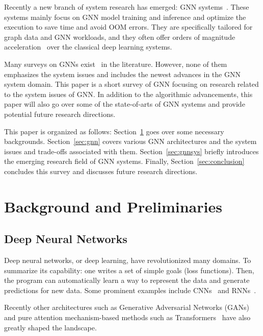 Recently a new branch of system research has emerged: GNN systems~\cite{dgl}. These systems mainly focus on GNN model training and inference and optimize the execution to save time and avoid OOM errors. They are specifically tailored for graph data and GNN workloads, and they often offer orders of magnitude acceleration~\cite{dgl, pyg} over the classical deep learning systems.

Many surveys on GNNs exist~\cite{compsurvey, yannsurvey, zhousurvey} in the literature. However, none of them emphasizes the system issues and includes the newest advances in the GNN system domain. This paper is a short survey of GNN focusing on research related to the system issues of GNN. In addition to the algorithmic advancements, this paper will also go over some of the state-of-arts of GNN systems and provide potential future research directions. 

This paper is organized as follows: Section~\ref{sec:background} goes over some necessary backgrounds. Section~\ref{sec:gnn} covers various GNN architectures and the system issues and trade-offs associated with them. Section~\ref{sec:gnnsys} briefly introduces the emerging research field of GNN systems. Finally, Section~\ref{sec:conclusion} concludes this survey and discusses future research directions. 



\vspace{-2mm}
\section{Background and Preliminaries}
\label{sec:background}
\subsection{Deep Neural Networks}
Deep neural networks, or deep learning, have revolutionized many domains. To summarize its capability: one writes a set of simple goals (loss functions). Then, the program can automatically learn a way to represent the data and generate predictions for new data. Some prominent examples include CNNs~\cite{cnn2} and RNNs~\cite{rnn}. 

Recently other architectures such as Generative Adversarial Networks (GANs)~\cite{gan} and pure attention mechanism-based methods such as Transformers~\cite{transformer} have also greatly shaped the landscape. 

